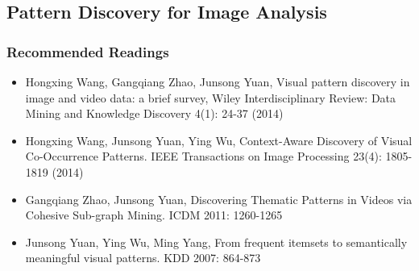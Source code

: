 \subsection{Pattern Discovery for Image Analysis}
\subsubsection{Recommended Readings}
\begin{itemize}
\item Hongxing Wang, Gangqiang Zhao, Junsong Yuan, Visual pattern discovery in image and video data: a brief survey, Wiley Interdisciplinary Review: Data Mining and Knowledge Discovery 4(1): 24-37 (2014)
\item Hongxing Wang, Junsong Yuan, Ying Wu, Context-Aware Discovery of Visual Co-Occurrence Patterns. IEEE Transactions on Image Processing 23(4): 1805-1819 (2014)
\item Gangqiang Zhao, Junsong Yuan, Discovering Thematic Patterns in Videos via Cohesive Sub-graph Mining. ICDM 2011: 1260-1265
\item Junsong Yuan, Ying Wu, Ming Yang, From frequent itemsets to semantically meaningful visual patterns. KDD 2007: 864-873
\end{itemize}

